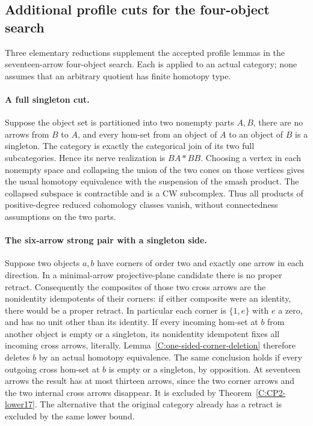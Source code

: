 \subsection{Additional profile cuts for the four-object search}

Three elementary reductions supplement the accepted profile lemmas in
the seventeen-arrow four-object search.  Each is applied to an actual
category; none assumes that an arbitrary quotient has finite homotopy type.

\paragraph{A full singleton cut.}
Suppose the object set is partitioned into two nonempty parts $A,B$,
there are no arrows from $B$ to $A$, and every hom-set from an object
of $A$ to an object of $B$ is a singleton.  The category is exactly
the categorical join of its two full subcategories.  Hence its nerve
realization is $BA*BB$.  Choosing a vertex in each nonempty space
and collapsing the union of the two cones on those vertices gives
the usual homotopy equivalence with the suspension of the smash
product.  The collapsed subspace is contractible and is a CW
subcomplex.  Thus all products of positive-degree reduced
cohomology classes vanish, without connectedness assumptions on
the two parts.

\paragraph{The six-arrow strong pair with a singleton side.}
Suppose two objects $a,b$ have corners of order two and exactly
one arrow in each direction.  In a minimal-arrow projective-plane
candidate there is no proper retract.  Consequently the composites
of those two cross arrows are the nonidentity idempotents of their
corners: if either composite were an identity, there would be a
proper retract.  In particular each corner is $\{1,e\}$ with $e$
a zero, and has no unit other than its identity.  If every incoming
hom-set at $b$ from another object is empty or a singleton, its
nonidentity idempotent fixes all incoming cross arrows, literally.
Lemma~\ref{C:one-sided-corner-deletion} therefore deletes $b$ by an
actual homotopy equivalence.  The same conclusion holds if every
outgoing cross hom-set at $b$ is empty or a singleton, by opposition.
At seventeen arrows the result has at most thirteen arrows, since
the two corner arrows and the two internal cross arrows disappear.
It is excluded by Theorem~\ref{C:CP2-lower17}.  The alternative
that the original category already has a retract is excluded by
the same lower bound.

